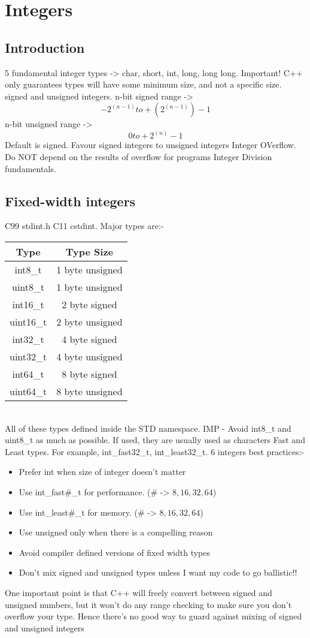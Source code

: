 \section{Integers}

\subsection{Introduction}
5 fundamental integer types -> char, short, int, long, long long.
Important! C++ only guarantees types will have some minimum size, and not a specific size. signed and unsigned integers.
n-bit signed range -> \[ -2^(n-1) to +(2^(n-1))-1 \]
n-bit unsigned range -> \[ 0 to +2^(n)-1 \]
Default is signed. Favour signed integers to unsigned integers
Integer OVerflow. Do NOT depend on the results of overflow for programs
Integer Division fundamentals.

\subsection{Fixed-width integers}
C99 stdint.h C11 cstdint. Major types are:- \\
\begin{tabular}{|c|c|}
    \hline
    \textbf{Type} & \textbf{Type Size} \\
    \hline
    int8\_t & 1 byte unsigned \\
    uint8\_t & 1 byte unsigned \\
    int16\_t & 2 byte signed \\
    uint16\_t & 2 byte unsigned \\
    int32\_t & 4 byte signed \\
    uint32\_t & 4 byte unsigned \\
    int64\_t & 8 byte signed \\
    uint64\_t & 8 byte unsigned \\
    \hline
\end{tabular}
\\
All of these types defined inside the STD namespace.
IMP - Avoid int8\_t and uint8\_t as much as possible. If used, they are
usually used as characters
Fast and Least types. For example, int\_fast32\_t, int\_least32\_t.
$6$ integers best practices:-
\begin{itemize}
    \item Prefer int when size of integer doesn't matter
    \item Use int\_fast\#\_t for performance. (\# -> $8, 16, 32, 64$)
    \item Use int\_least\#\_t for memory. (\# -> $8, 16, 32, 64$)
    \item Use unsigned only when there is a compelling reason
    \item Avoid compiler defined versions of fixed width types
    \item Don't mix signed and unsigned types unless I want my code to go ballistic!!
\end{itemize}

One important point is that C++ will freely convert between signed and
unsigned numbers, but it won’t do any range checking to make sure you
don’t overflow your type. Hence there's no good way to guard against
mixing of signed and unsigned integers